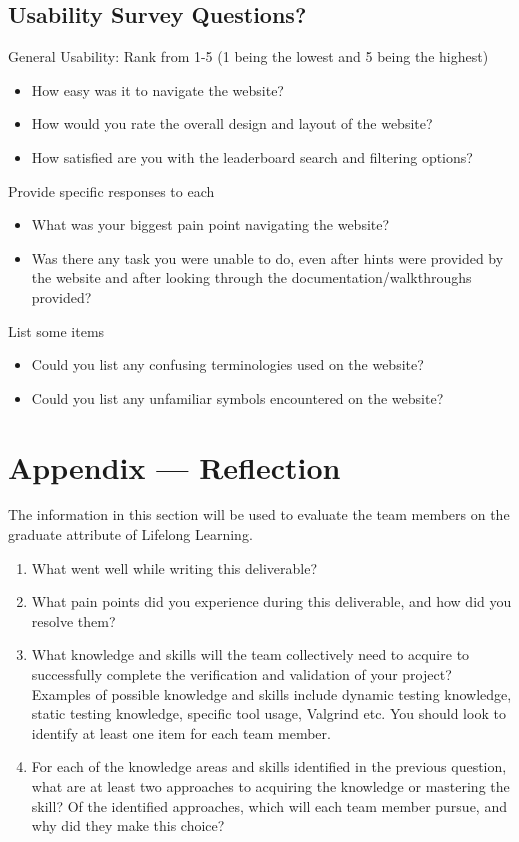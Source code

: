 \documentclass[12pt, titlepage]{article}
\begin{document}
\subsection{Usability Survey Questions?}

General Usability: Rank from 1-5 (1 being the lowest and 5 being the highest)
\begin{itemize}
    \item How easy was it to navigate the website?
    \item How would you rate the overall design and layout of the website?
    \item How satisfied are you with the leaderboard search and filtering options?
\end{itemize}
Provide specific responses to each
\begin{itemize}
    \item What was your biggest pain point navigating 
    the website?
    \item Was there any task you were unable to do, even after hints were provided by the website and after looking through the documentation/walkthroughs provided?
\end{itemize}
List some items
\begin{itemize}
    \item Could you list any confusing terminologies used on the website?
    \item Could you list any unfamiliar symbols encountered on the website?
\end{itemize}


\newpage{}
\section*{Appendix --- Reflection}

The information in this section will be used to evaluate the team members on the
graduate attribute of Lifelong Learning.



\begin{enumerate}
  \item What went well while writing this deliverable? 
  \item What pain points did you experience during this deliverable, and how
    did you resolve them?
  \item What knowledge and skills will the team collectively need to acquire to
  successfully complete the verification and validation of your project?
  Examples of possible knowledge and skills include dynamic testing knowledge,
  static testing knowledge, specific tool usage, Valgrind etc.  You should look to
  identify at least one item for each team member.
  \item For each of the knowledge areas and skills identified in the previous
  question, what are at least two approaches to acquiring the knowledge or
  mastering the skill?  Of the identified approaches, which will each team
  member pursue, and why did they make this choice?
\end{enumerate}
\end{document}
